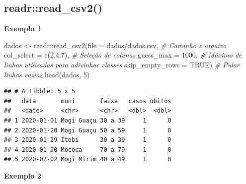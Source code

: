 \documentclass[
]{book}
\newenvironment{Shaded}{\begin{snugshade}}{\end{snugshade}}
\newcommand{\AttributeTok}[1]{\textcolor[rgb]{0.77,0.63,0.00}{#1}}
\newcommand{\CommentTok}[1]{\textcolor[rgb]{0.56,0.35,0.01}{\textit{#1}}}
\newcommand{\ConstantTok}[1]{\textcolor[rgb]{0.00,0.00,0.00}{#1}}
\newcommand{\DecValTok}[1]{\textcolor[rgb]{0.00,0.00,0.81}{#1}}
\newcommand{\FunctionTok}[1]{\textcolor[rgb]{0.00,0.00,0.00}{#1}}
\newcommand{\NormalTok}[1]{#1}
\newcommand{\OtherTok}[1]{\textcolor[rgb]{0.56,0.35,0.01}{#1}}
\newcommand{\SpecialCharTok}[1]{\textcolor[rgb]{0.00,0.00,0.00}{#1}}
\newcommand{\StringTok}[1]{\textcolor[rgb]{0.31,0.60,0.02}{#1}}
\theoremstyle{definition}
\theoremstyle{definition}
\theoremstyle{definition}
\theoremstyle{definition}
\theoremstyle{remark}
\begin{document}
\hypertarget{readrread_csv2}{%
\subsection{readr::read\_csv2()}\label{readrread_csv2}}

\textbf{Exemplo 1}

\begin{Shaded}
\begin{Highlighting}[]
\NormalTok{dados }\OtherTok{\textless{}{-}}\NormalTok{ readr}\SpecialCharTok{::}\FunctionTok{read\_csv2}\NormalTok{(}\AttributeTok{file =} \StringTok{\textquotesingle{}dados/dados.csv\textquotesingle{}}\NormalTok{,  }\CommentTok{\# Caminho e arquivo}
                          \AttributeTok{col\_select =} \FunctionTok{c}\NormalTok{(}\DecValTok{2}\NormalTok{,}\DecValTok{4}\SpecialCharTok{:}\DecValTok{7}\NormalTok{),     }\CommentTok{\# Seleção de colunas}
                          \AttributeTok{guess\_max =} \DecValTok{1000}\NormalTok{,          }\CommentTok{\# Máximo de linhas utilizadas para adivinhar classes}
                          \AttributeTok{skip\_empty\_rows =} \ConstantTok{TRUE}\NormalTok{)    }\CommentTok{\# Pular linhas vazias}
\FunctionTok{head}\NormalTok{(dados, }\DecValTok{5}\NormalTok{)                                       }
\end{Highlighting}
\end{Shaded}

\begin{verbatim}
## # A tibble: 5 x 5
##   data       muni       faixa   casos obitos
##   <date>     <chr>      <chr>   <dbl>  <dbl>
## 1 2020-01-01 Mogi Guaçu 30 a 39     1      0
## 2 2020-01-20 Mogi Guaçu 50 a 59     1      0
## 3 2020-01-29 Itobi      30 a 39     1      0
## 4 2020-01-30 Mococa     70 a 79     1      0
## 5 2020-02-02 Mogi Mirim 40 a 49     1      0
\end{verbatim}

\textbf{Exemplo 2}
\end{document}
